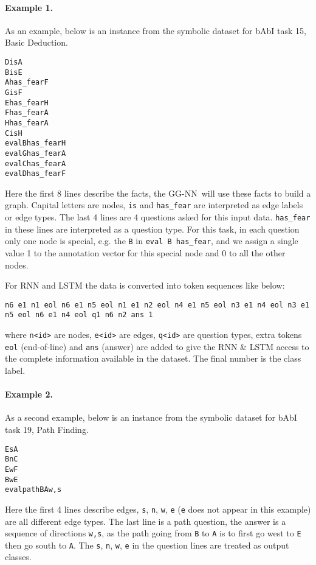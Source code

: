 \documentclass{article} \usepackage{iclr2016_conference,times}
\newcommand{\OurMethodMinorShort}{GG-NN}
\begin{document}
\paragraph{Example 1. }
As an example, below is an instance from the symbolic dataset for bAbI task 15, Basic
Deduction.
\begin{framed}
\begin{alltt}
D is A
B is E
A has_fear F
G is F
E has_fear H
F has_fear A
H has_fear A
C is H
eval B has_fear      H
eval G has_fear      A
eval C has_fear      A
eval D has_fear      F
\end{alltt}
\end{framed}
Here the first 8 lines describe the facts, the \OurMethodMinorShort~will use
these facts to build a graph.  Capital letters are nodes, \texttt{is} and
\texttt{has\_fear} are interpreted as edge labels or edge types. The last 4
lines are 4 questions asked for this input data. \texttt{has\_fear} in these
lines are interpreted as a question type. For this task, in each question only
one node is special, e.g. the \texttt{B} in \texttt{eval B has\_fear}, and we
assign a single value 1 to the annotation vector for this special node and 0
to all the other nodes.

For RNN and LSTM the data is converted into token
sequences like below:
\begin{framed}
    \texttt{n6 e1 n1 eol n6 e1 n5 eol n1 e1 n2 eol n4 e1 n5 eol n3 e1 n4 eol
    n3 e1 n5 eol n6 e1 n4 eol q1 n6 n2 ans 1}
\end{framed}
where \texttt{n<id>} are nodes, \texttt{e<id>} are edges, \texttt{q<id>} are
question types, extra tokens \texttt{eol} (end-of-line) and \texttt{ans}
(answer) are added to give the RNN \& LSTM access to the complete information
available in the dataset. The final number is the class label.

\paragraph{Example 2. }
As a second example, below is an instance from the symbolic dataset for bAbI task 19, Path Finding.
\begin{framed}
\begin{alltt}
E s A
B n C
E w F
B w E
eval path B A w,s
\end{alltt}
\end{framed}
Here the first 4 lines describe edges, \texttt{s}, \texttt{n}, \texttt{w},
\texttt{e} (\texttt{e} does not appear in this example) are all different edge types. The last line
is a path question, the answer is a sequence of directions \texttt{w,s}, as
the path going from \texttt{B} to \texttt{A} is to first go west to \texttt{E}
then go south to \texttt{A}. The \texttt{s}, \texttt{n}, \texttt{w},
\texttt{e} in the question lines are treated as output classes.
\end{document}
